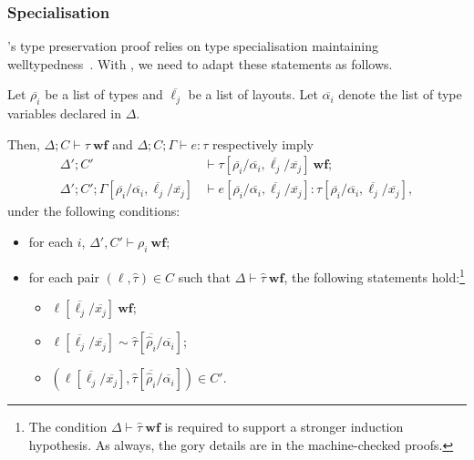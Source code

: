 \subsubsection{Specialisation}

\cogent's type preservation proof relies on type specialisation maintaining welltypedness~\citep[Lemmas 3 and 4]{OConnor:2016}. 
With \Dargent, we need to adapt these statements as follows.
\begin{lemma}
  \label{lem:specialisation-lemmas}
  Let $\overline{\rho_i}$ be a list of types and $\overline{\ell_j}$ be a list
  of layouts. Let $\overline{\alpha_i}$ denote the list of type variables declared
  in $\Delta$.

  Then, $\Delta;C \vdash \tau\ \mathbf{wf} $ and  $\Delta;C;\Gamma \vdash e : \tau$  
  respectively imply 
     \begin{align*}
      \Delta';C'& \vdash \tau[\overline{\rho_i}/\overline{\alpha_i}, \overline{\ell_j}/\overline{x_j}]\ \mathbf{wf}; \\
      \Delta';C';\Gamma[\overline{\rho_i}/\overline{\alpha_i}, \overline{\ell_j}/\overline{x_j}]%
      & \vdash e[\overline{\rho_i}/\overline{\alpha_i}, \overline{\ell_j}/\overline{x_j}]: \tau[\overline{\rho_i}/\overline{\alpha_i}, \overline{\ell_j}/\overline{x_j}  ],
     \end{align*}
  under the following conditions:
  \begin{itemize}
    \item for each $i$, $\Delta', C'\vdash \rho_i\ \textbf{wf}$;
    \item for each pair $(\ell, \hat{\tau}) \in C$ such that
      $\Delta \vdash \hat{\tau}\ \mathbf{wf}$, the following statements hold:\footnote{The
        condition $\Delta \vdash \hat{\tau}\ \mathbf{wf}$ is required to support a stronger induction hypothesis. As always, the gory details are in the machine-checked proofs. }
      \begin{itemize}
      \item $\ell[\overline{\ell_j}/\overline{x_j}]\ \mathbf{wf}$;
      \item 
        $ \ell[\overline{\ell_j}/\overline{x_j}] \sim \hat{\tau}[\overline{\hat{\rho}_i}/\overline{\alpha_i}]$;
       \item $(\ell[\overline{\ell_j}/\overline{x_j}], \hat{\tau}[\overline{\hat{\rho}_i}/\overline{\alpha_i}]) \in C' $.
      \end{itemize}
  \end{itemize}
\end{lemma}


